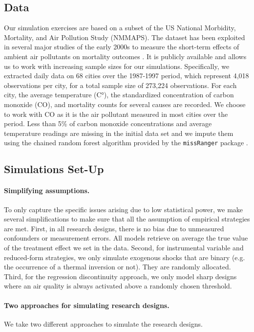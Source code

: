 \documentclass[12pt]{article}
\begin{document}
        \subsection{Data}
        
        Our simulation exercises are based on a subset of the US National Morbidity, Mortality, and Air Pollution Study (NMMAPS). The dataset has been exploited in several major studies of the early 2000s to measure the short-term effects of ambient air pollutants on mortality outcomes \citep{peng2008statistical}. It is publicly available and allows us to work with increasing sample sizes for our simulations. Specifically, we extracted daily data on 68 cities over the 1987-1997 period, which represent 4,018 observations per city, for a total sample size of 273,224 observations. For each city, the average temperature (C°), the standardized concentration of carbon monoxide (CO), and mortality counts for several causes are recorded. We choose to work with CO as it is the air pollutant measured in most cities over the period. Less than 5\% of carbon monoxide concentrations and average temperature readings are missing in the initial data set and we impute them using the chained random forest algorithm provided by the \texttt{missRanger} package \citep{mayer_missranger_2019}.
        
        \subsection{Simulations Set-Up}
        
        \paragraph{Simplifying assumptions.} To only capture the specific issues arising due to low statistical power, we make several simplifications to make sure that all the assumption of empirical strategies are met. First, in all research designs, there is no bias due to unmeasured confounders or measurement errors. All models retrieve on average the true value of the treatment effect we set in the data. Second, for instrumental variable and reduced-form strategies, we only simulate exogenous shocks that are binary (e.g. the occurrence of a thermal inversion or not). They are randomly allocated. Third, for the regression discontinuity approach, we only model sharp designs where an air quality is always activated above a randomly chosen threshold.
     
        \paragraph{Two approaches for simulating research designs.} We take two different approaches to simulate the research designs. 
        
\end{document}
